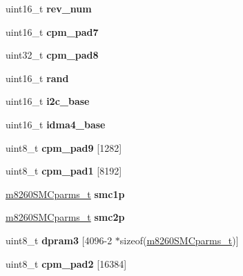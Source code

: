 \begin{DoxyCompactItemize}
uint16\+\_\+t {\bfseries rev\+\_\+num}
\item 
\mbox{\label{structm8260___aed79e17f847fe457601d621c992c643e}} 
uint16\+\_\+t {\bfseries cpm\+\_\+pad7}
\item 
\mbox{\label{structm8260___ac3a3abc5808d3c27df496a8abe9db504}} 
uint32\+\_\+t {\bfseries cpm\+\_\+pad8}
\item 
\mbox{\label{structm8260___a4c239a2a2d359e0a165652100bac7eab}} 
uint16\+\_\+t {\bfseries rand}
\item 
\mbox{\label{structm8260___ad2dffcd1695005c44f888fcc1a726ad2}} 
uint16\+\_\+t {\bfseries i2c\+\_\+base}
\item 
\mbox{\label{structm8260___a770078bc0078a126126c4e107b89f6ac}} 
uint16\+\_\+t {\bfseries idma4\+\_\+base}
\item 
\mbox{\label{structm8260___a2c43752b79786941d107693c914bad9a}} 
uint8\+\_\+t {\bfseries cpm\+\_\+pad9} \mbox{[}1282\mbox{]}
\item 
\mbox{\label{structm8260___a375634bbf74e4350b419ba8b7dc86b6f}} 
uint8\+\_\+t {\bfseries cpm\+\_\+pad1} \mbox{[}8192\mbox{]}
\item 
\mbox{\label{structm8260___a49d3200955d86c6cf8ae605664b0016c}} 
\mbox{\hyperlink{structm8260SMCparms__}{m8260\+S\+M\+Cparms\+\_\+t}} {\bfseries smc1p}
\item 
\mbox{\label{structm8260___a8690a8dfbc069338b9a980231cc1ab05}} 
\mbox{\hyperlink{structm8260SMCparms__}{m8260\+S\+M\+Cparms\+\_\+t}} {\bfseries smc2p}
\item 
\mbox{\label{structm8260___adc3ea2bbce225fbced429285c64e70f6}} 
uint8\+\_\+t {\bfseries dpram3} \mbox{[}4096-\/2 $\ast$sizeof(\mbox{\hyperlink{structm8260SMCparms__}{m8260\+S\+M\+Cparms\+\_\+t}})\mbox{]}
\item 
\mbox{\label{structm8260___a95c7b20b4b3655ff64336f615a346880}} 
uint8\+\_\+t {\bfseries cpm\+\_\+pad2} \mbox{[}16384\mbox{]}

\end{DoxyCompactItemize}
